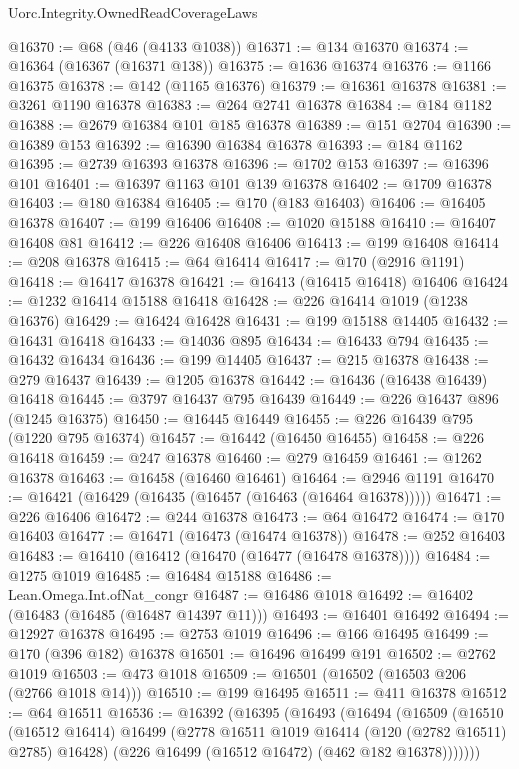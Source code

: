 \begin{lexlean}{Uorc.Integrity.OwnedReadCoverageLaws}
\begin{coremodule}
@16370 := @68 (@46 (@4133 @1038))
@16371 := @134 @16370
@16374 := @16364 (@16367 (@16371 @138))
@16375 := @1636 @16374
@16376 := @1166 @16375
@16378 := @142 (@1165 @16376)
@16379 := @16361 @16378
@16381 := @3261 @1190 @16378
@16383 := @264 @2741 @16378
@16384 := @184 @1182
@16388 := @2679 @16384 @101 @185 @16378
@16389 := @151 @2704
@16390 := @16389 @153
@16392 := @16390 @16384 @16378
@16393 := @184 @1162
@16395 := @2739 @16393 @16378
@16396 := @1702 @153
@16397 := @16396 @101
@16401 := @16397 @1163 @101 @139 @16378
@16402 := @1709 @16378
@16403 := @180 @16384
@16405 := @170 (@183 @16403)
@16406 := @16405 @16378
@16407 := @199 @16406
@16408 := @1020 @15188
@16410 := @16407 @16408 @81
@16412 := @226 @16408 @16406
@16413 := @199 @16408
@16414 := @208 @16378
@16415 := @64 @16414
@16417 := @170 (@2916 @1191)
@16418 := @16417 @16378
@16421 := @16413 (@16415 @16418) @16406
@16424 := @1232 @16414 @15188 @16418
@16428 := @226 @16414 @1019 (@1238 @16376)
@16429 := @16424 @16428
@16431 := @199 @15188 @14405
@16432 := @16431 @16418
@16433 := @14036 @895
@16434 := @16433 @794
@16435 := @16432 @16434
@16436 := @199 @14405
@16437 := @215 @16378
@16438 := @279 @16437
@16439 := @1205 @16378
@16442 := @16436 (@16438 @16439) @16418
@16445 := @3797 @16437 @795 @16439
@16449 := @226 @16437 @896 (@1245 @16375)
@16450 := @16445 @16449
@16455 := @226 @16439 @795 (@1220 @795 @16374)
@16457 := @16442 (@16450 @16455)
@16458 := @226 @16418
@16459 := @247 @16378
@16460 := @279 @16459
@16461 := @1262 @16378
@16463 := @16458 (@16460 @16461)
@16464 := @2946 @1191
@16470 := @16421 (@16429 (@16435 (@16457 (@16463 (@16464 @16378)))))
@16471 := @226 @16406
@16472 := @244 @16378
@16473 := @64 @16472
@16474 := @170 @16403
@16477 := @16471 (@16473 (@16474 @16378))
@16478 := @252 @16403
@16483 := @16410 (@16412 (@16470 (@16477 (@16478 @16378))))
@16484 := @1275 @1019
@16485 := @16484 @15188
@16486 := Lean.Omega.Int.ofNat_congr
@16487 := @16486 @1018
@16492 := @16402 (@16483 (@16485 (@16487 @14397 @11)))
@16493 := @16401 @16492
@16494 := @12927 @16378
@16495 := @2753 @1019
@16496 := @166 @16495
@16499 := @170 (@396 @182) @16378
@16501 := @16496 @16499 @191
@16502 := @2762 @1019
@16503 := @473 @1018
@16509 := @16501 (@16502 (@16503 @206 (@2766 @1018 @14)))
@16510 := @199 @16495
@16511 := @411 @16378
@16512 := @64 @16511
@16536 := @16392
    (@16395
      (@16493
        (@16494
          (@16509
            (@16510
              (@16512 @16414)
              @16499
              (@2778 @16511 @1019 @16414 (@120 (@2782 @16511) @2785) @16428)
              (@226 @16499 (@16512 @16472) (@462 @182 @16378)))))))

\end{coremodule}
\end{lexlean}
